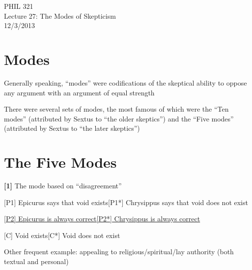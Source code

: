 \documentclass[11pt]{article}
\begin{document}
\thispagestyle{empty}
\begin{center} \LARGE{PHIL 321\\ Lecture 27: The Modes of Skepticism}\\ \vspace*{2mm}
\large{12/3/2013}\end{center}
\thispagestyle{empty}\vspace*{3mm}
\vspace*{-8mm}

\section*{Modes}

\noindent Generally speaking, ``modes'' were codifications of the skeptical ability to oppose any argument with an argument of equal strength
\vspace*{2mm}

\noindent There were several sets of modes, the most famous of which were the ``Ten modes'' (attributed by Sextus to ``the older skeptics'') and the ``Five modes'' (attributed by Sextus to ``the later skeptics'')

\section*{The Five Modes}

\noindent \textbf{[1]} The mode based on ``disagreement''
\vspace*{2mm}

[P1] Epicurus says that void exists\hspace*{30mm}[P1*] Chrysippus says that void does not exist
\vspace*{1mm}

\underline{[P2] Epicurus is always correct}\hspace*{35mm}\underline{[P2*] Chrysippus is always correct}
\vspace*{1mm}

[C] Void exists\hspace*{60mm}[C*] Void does not exist
\vspace*{2mm}

\noindent\hspace*{3mm}Other frequent example: appealing to religious/spiritual/lay authority (both textual and personal)
\vspace*{3mm}
\end{document}
